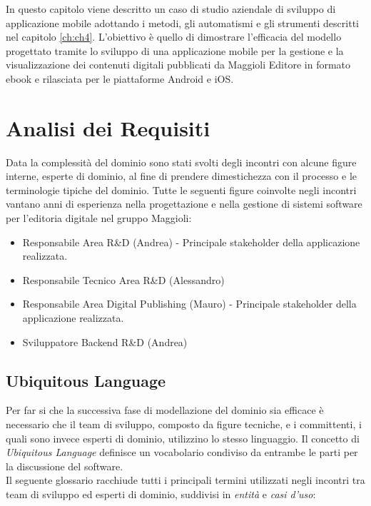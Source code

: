 In questo capitolo viene descritto un caso di studio aziendale di sviluppo di applicazione mobile adottando i metodi, gli automatismi e gli strumenti descritti nel capitolo \ref{ch:ch4}. L'obiettivo è quello di dimostrare l'efficacia del modello progettato tramite lo sviluppo di una applicazione mobile per la gestione e la visualizzazione dei contenuti digitali pubblicati da Maggioli Editore in formato ebook e rilasciata per le piattaforme Android e iOS.

\section{Analisi dei Requisiti}
Data la complessità del dominio sono stati svolti degli incontri con alcune figure interne, esperte di dominio, al fine di prendere dimestichezza con il processo e le terminologie tipiche del dominio. Tutte le seguenti figure coinvolte negli incontri vantano anni di esperienza nella progettazione e nella gestione di sistemi software per l'editoria digitale nel gruppo Maggioli:
\begin{itemize}
    \item Responsabile Area R\&D (Andrea) - Principale stakeholder della applicazione realizzata.
    \item Responsabile Tecnico Area R\&D (Alessandro)
    \item Responsabile Area Digital Publishing (Mauro) - Principale stakeholder della applicazione realizzata.
    \item Sviluppatore Backend R\&D (Andrea)
\end{itemize}

\subsection{Ubiquitous Language}
Per far si che la successiva fase di modellazione del dominio sia efficace è necessario che il team di sviluppo, composto da figure tecniche, e i committenti, i quali sono invece esperti di dominio, utilizzino lo stesso linguaggio. Il concetto di \textit{Ubiquitous Language} definisce un vocabolario condiviso da entrambe le parti per la discussione del software\cite{evans_domain-driven_2004}.\\
Il seguente glossario racchiude tutti i principali termini utilizzati negli incontri tra team di sviluppo ed esperti di dominio, suddivisi in \textit{entità} e \textit{casi d'uso}:

